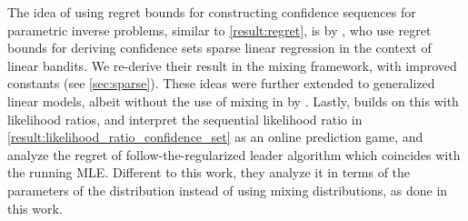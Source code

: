 The idea of using regret bounds for constructing confidence sequences for parametric inverse problems, similar to \cref{result:regret}, is by \citet{abbasi2012online}, who use regret bounds for deriving confidence sets sparse linear regression in the context of linear bandits. We re-derive their result in the mixing framework, with improved constants (see \cref{sec:sparse}). These ideas were further extended to generalized linear models, albeit without the use of mixing in by \cite{Jun2017,lee2024improved}. Lastly, \cite{Emm23} builds on this with likelihood ratios, and interpret the sequential likelihood ratio in \cref{result:likelihood_ratio_confidence_set} as an online prediction game, and analyze the regret of follow-the-regularized leader algorithm which coincides with the running MLE. Different to this work, they analyze it in terms of the parameters of the distribution instead of using mixing distributions, as done in this work. %





